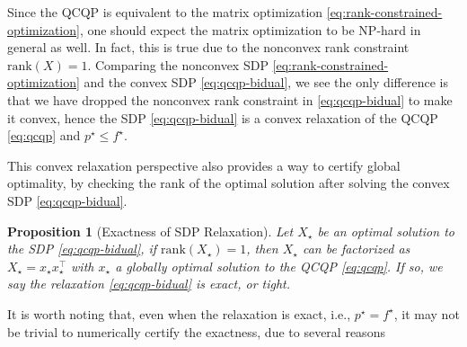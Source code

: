 \documentclass[
]{book}
\newtheorem{proposition}{Proposition}[chapter]
\theoremstyle{definition}
\theoremstyle{definition}
\theoremstyle{definition}
\theoremstyle{definition}
\theoremstyle{remark}
\begin{document}
Since the QCQP is equivalent to the matrix optimization \eqref{eq:rank-constrained-optimization}, one should expect the matrix optimization to be NP-hard in general as well. In fact, this is true due to the nonconvex rank constraint \(\mathrm{rank}(X) = 1\). Comparing the nonconvex SDP \eqref{eq:rank-constrained-optimization} and the convex SDP \eqref{eq:qcqp-bidual}, we see the only difference is that we have dropped the nonconvex rank constraint in \eqref{eq:qcqp-bidual} to make it convex, hence the SDP \eqref{eq:qcqp-bidual} is a convex relaxation of the QCQP \eqref{eq:qcqp} and \(p^\star \leq f^\star\).

This convex relaxation perspective also provides a way to certify global optimality, by checking the rank of the optimal solution after solving the convex SDP \eqref{eq:qcqp-bidual}.

\begin{proposition}[Exactness of SDP Relaxation]
\protect\hypertarget{prp:SDPExactness}{}\label{prp:SDPExactness}Let \(X_\star\) be an optimal solution to the SDP \eqref{eq:qcqp-bidual}, if \(\mathrm{rank}(X_\star) = 1\), then \(X_\star\) can be factorized as \(X_\star = x_\star x_\star^\top\) with \(x_\star\) a globally optimal solution to the QCQP \eqref{eq:qcqp}. If so, we say the relaxation \eqref{eq:qcqp-bidual} is exact, or tight.
\end{proposition}

It is worth noting that, even when the relaxation is exact, i.e., \(p^\star = f^\star\), it may not be trivial to numerically certify the exactness, due to several reasons
\end{document}
